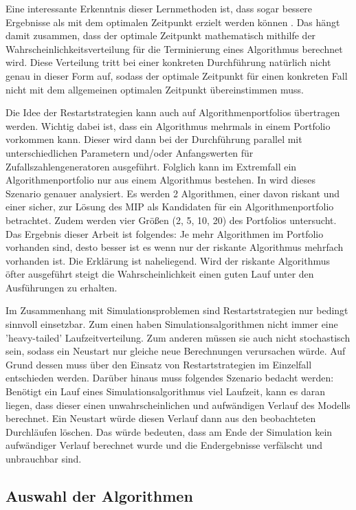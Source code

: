 Eine interessante Erkenntnis dieser Lernmethoden ist, dass sogar bessere Ergebnisse als mit dem optimalen Zeitpunkt erzielt werden können \cite{kautz02}. Das hängt damit zusammen, dass der optimale Zeitpunkt mathematisch mithilfe der Wahrscheinlichkeitsverteilung für die Terminierung eines Algorithmus berechnet wird. Diese Verteilung tritt bei einer konkreten Durchführung natürlich nicht genau in dieser Form auf, sodass der optimale Zeitpunkt für einen konkreten Fall nicht mit dem allgemeinen optimalen Zeitpunkt übereinstimmen muss.

Die Idee der Restartstrategien kann auch auf Algorithmenportfolios übertragen werden. Wichtig dabei ist, dass ein Algorithmus mehrmals in einem Portfolio vorkommen kann. Dieser wird dann bei der Durchführung parallel mit unterschiedlichen Parametern und/oder Anfangswerten für Zufallszahlengeneratoren ausgeführt. Folglich kann im Extremfall ein Algorithmenportfolio nur aus einem Algorithmus bestehen. In \cite{gomesselman97} wird dieses Szenario genauer analysiert. Es werden 2 Algorithmen, einer davon riskant und einer sicher, zur Lösung des MIP als Kandidaten für ein Algorithmenportfolio betrachtet. Zudem werden vier Größen (2, 5, 10, 20) des Portfolios untersucht. Das Ergebnis dieser Arbeit ist folgendes: Je mehr Algorithmen im Portfolio vorhanden sind, desto besser ist es wenn nur der riskante Algorithmus mehrfach vorhanden ist. Die Erklärung ist naheliegend. Wird der riskante Algorithmus öfter ausgeführt steigt die Wahrscheinlichkeit einen guten Lauf unter den Ausführungen zu erhalten.

Im Zusammenhang mit Simulationsproblemen sind Restartstrategien nur bedingt sinnvoll einsetzbar. Zum einen haben Simulationsalgorithmen nicht immer eine 'heavy-tailed' Laufzeitverteilung. Zum anderen müssen sie auch nicht stochastisch sein, sodass ein Neustart nur gleiche neue Berechnungen verursachen würde. Auf Grund dessen muss über den Einsatz von Restartstrategien im Einzelfall entschieden werden. Darüber hinaus muss folgendes Szenario bedacht werden: Benötigt ein Lauf eines Simulationsalgorithmus viel Laufzeit, kann es daran liegen, dass dieser einen unwahrscheinlichen und aufwändigen Verlauf des Modells berechnet. Ein Neustart würde diesen Verlauf dann aus den beobachteten Durchläufen löschen. Das würde bedeuten, dass am Ende der Simulation kein aufwändiger Verlauf berechnet wurde und die Endergebnisse verfälscht und unbrauchbar sind.

\subsection{Auswahl der Algorithmen}

